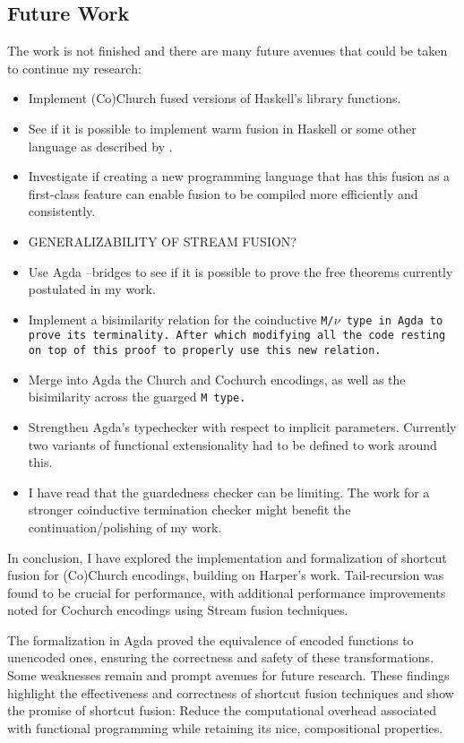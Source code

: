 \subsection*{Future Work}
The work is not finished and there are many future avenues that could be taken to continue my research:
\begin{itemize}[noitemsep]
    \item Implement (Co)Church fused versions of Haskell's library functions.
    \item See if it is possible to implement warm fusion in Haskell or some other language as described by \cite{Launchbury1995}.
    \item Investigate if creating a new programming language that has this fusion as a first-class feature can enable fusion to be compiled more efficiently and consistently.
    \item GENERALIZABILITY OF STREAM FUSION?
    \item Use Agda --bridges to see if it is possible to prove the free theorems currently postulated in my work.
    \item Implement a bisimilarity relation for the coinductive \tt{M}/$\nu$  type in Agda to prove its terminality. After which modifying all the code resting on top of this proof to properly use this new relation.
    \item Merge into Agda the Church and Cochurch encodings, as well as the bisimilarity across the guarged \tt{M} type.
    \item Strengthen Agda's typechecker with respect to implicit parameters. Currently two variants of functional extensionality had to be defined to work around this.
    \item I have read that the guardedness checker can be limiting. The work for a stronger coinductive termination checker might benefit the continuation/polishing of my work.
\end{itemize}
In conclusion, I have explored the implementation and formalization of shortcut fusion for (Co)Church encodings, building on Harper's work.
Tail-recursion was found to be crucial for performance, with additional performance improvements noted for Cochurch encodings using Stream fusion techniques.

The formalization in Agda proved the equivalence of encoded functions to unencoded ones, ensuring the correctness and safety of these transformations.
Some weaknesses remain and prompt avenues for future research.
These findings highlight the effectiveness and correctness of shortcut fusion techniques and show the promise of shortcut fusion: Reduce the computational overhead associated with functional programming while retaining its nice, compositional properties.
